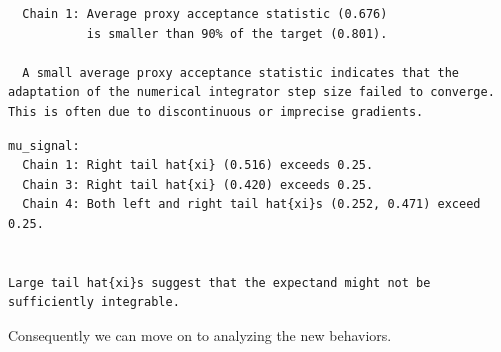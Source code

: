 \documentclass[
  letterpaper,
  DIV=11,
  numbers=noendperiod]{scrartcl}
\newenvironment{Shaded}{\begin{snugshade}}{\end{snugshade}}
\newcommand{\FunctionTok}[1]{\textcolor[rgb]{0.28,0.35,0.67}{#1}}
\newcommand{\NormalTok}[1]{\textcolor[rgb]{0.00,0.23,0.31}{#1}}
\newcommand{\OtherTok}[1]{\textcolor[rgb]{0.00,0.23,0.31}{#1}}
\newcommand{\SpecialCharTok}[1]{\textcolor[rgb]{0.37,0.37,0.37}{#1}}
\newcommand{\StringTok}[1]{\textcolor[rgb]{0.13,0.47,0.30}{#1}}
\begin{document}
\begin{verbatim}
  Chain 1: Average proxy acceptance statistic (0.676)
           is smaller than 90% of the target (0.801).

  A small average proxy acceptance statistic indicates that the
adaptation of the numerical integrator step size failed to converge.
This is often due to discontinuous or imprecise gradients.
\end{verbatim}

\begin{Shaded}
\end{Shaded}

\begin{verbatim}
mu_signal:
  Chain 1: Right tail hat{xi} (0.516) exceeds 0.25.
  Chain 3: Right tail hat{xi} (0.420) exceeds 0.25.
  Chain 4: Both left and right tail hat{xi}s (0.252, 0.471) exceed 0.25.


Large tail hat{xi}s suggest that the expectand might not be
sufficiently integrable.
\end{verbatim}

Consequently we can move on to analyzing the new behaviors.
\end{document}
